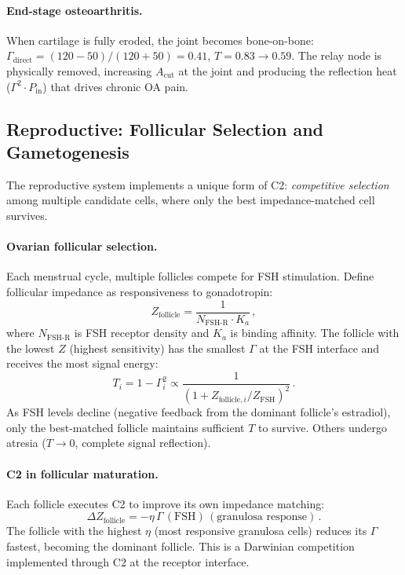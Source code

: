 \documentclass[aps,pre,twocolumn,superscriptaddress,floatfix]{revtex4-2}
\begin{document}
\paragraph{End-stage osteoarthritis.}
When cartilage is fully eroded, the joint becomes
bone-on-bone: $\Gamma_{\text{direct}} = (120-50)/(120+50)
= 0.41$, $T = 0.83 \to 0.59$.
The relay node is physically removed, increasing
$A_{\text{cut}}$ at the joint and producing the reflection
heat ($\Gamma^2 \cdot P_{\text{in}}$) that drives
chronic OA pain.


\subsection{Reproductive: Follicular Selection and Gametogenesis}
\label{sec:reproductive}

The reproductive system implements a unique form of C2:
\emph{competitive selection} among multiple candidate cells,
where only the best impedance-matched cell survives.

\paragraph{Ovarian follicular selection.}
Each menstrual cycle, multiple follicles compete for
FSH stimulation.  Define follicular impedance
as responsiveness to gonadotropin:
\begin{equation}
  Z_{\text{follicle}} = \frac{1}{N_{\text{FSH-R}} \cdot K_a}\,,
  \label{eq:z-follicle}
\end{equation}
where $N_{\text{FSH-R}}$ is FSH receptor density and
$K_a$ is binding affinity.  The follicle with the
lowest $Z$ (highest sensitivity) has the smallest
$\Gamma$ at the FSH interface and receives the
most signal energy:
\begin{equation}
  T_i = 1 - \Gamma_i^2 \propto
  \frac{1}{(1 + Z_{\text{follicle},i}/Z_{\text{FSH}})^2}\,.
  \label{eq:follicle-selection}
\end{equation}
As FSH levels decline (negative feedback from
the dominant follicle's estradiol), only the
best-matched follicle maintains sufficient
$T$ to survive.  Others undergo atresia
($T \to 0$, complete signal reflection).

\paragraph{C2 in follicular maturation.}
Each follicle executes C2 to improve its own
impedance matching:
\begin{equation}
  \Delta Z_{\text{follicle}} =
  -\eta\,\Gamma\,(\text{FSH})\,
  (\text{granulosa response})\,.
  \label{eq:c2-follicle}
\end{equation}
The follicle with the highest $\eta$ (most
responsive granulosa cells) reduces its $\Gamma$
fastest, becoming the dominant follicle.
This is a Darwinian competition implemented
through C2 at the receptor interface.
\end{document}
